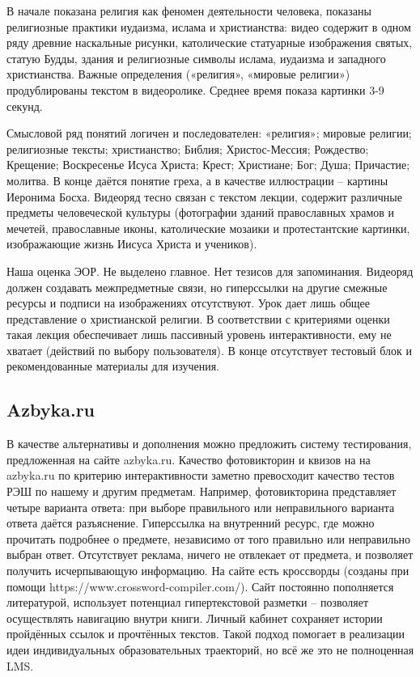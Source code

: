 В начале показана религия как феномен деятельности человека, показаны религиозные практики иудаизма, ислама и христианства: видео содержит в одном ряду древние наскальные рисунки, католические статуарные изображения святых, статую Будды, здания и религиозные символы ислама, иудаизма и западного христианства. Важные определения («религия», «мировые религии») продублированы текстом в видеоролике. Среднее время показа картинки 3-9 секунд.

Смысловой ряд понятий логичен и последователен: «религия»; мировые религии; религиозные тексты; христианство; Библия; Христос-Мессия; Рождество; Крещение; Воскресенье Исуса Христа; Крест; Христиане; Бог; Душа; Причастие; молитва. В конце даётся понятие греха, а в качестве иллюстрации – картины Иеронима Босха. Видеоряд тесно связан с текстом лекции, содержит различные предметы человеческой культуры (фотографии зданий православных храмов и мечетей, православные иконы, католические мозаики и протестантские картинки, изображающие жизнь Иисуса Христа и учеников).

Наша оценка ЭОР. Не выделено главное. Нет тезисов для запоминания. Видеоряд должен создавать межпредметные связи, но гиперссылки на другие смежные ресурсы и подписи на изображениях отсутствуют. Урок дает лишь общее представление о христианской религии. В соответствии с критериями оценки такая лекция обеспечивает лишь пассивный уровень интерактивности, ему не хватает (действий по выбору пользователя). В конце отсутствует тестовый блок и рекомендованные материалы для изучения.

\subsection{Azbyka.ru}
В качестве альтернативы и дополнения можно предложить систему тестирования, предложенная на сайте azbyka.ru. Качество фотовикторин и квизов на на azbyka.ru по критерию интерактивности заметно превосходит качество тестов РЭШ по нашему и другим предметам. Например, фотовикторина представляет четыре варианта ответа: при выборе правильного или неправильного варианта ответа даётся разъяснение. Гиперссылка на внутренний ресурс, где можно прочитать подробнее о предмете, независимо от того правильно или неправильно выбран ответ. Отсутствует реклама, ничего не отвлекает от предмета, и позволяет получить исчерпывающую информацию. На сайте есть кроссворды (созданы при помощи https://www.crossword-compiler.com/). Сайт постоянно пополняется литературой, использует потенциал гипертекстовой разметки – позволяет осуществлять навигацию внутри книги. Личный кабинет сохраняет истории пройдённых ссылок и прочтённых текстов. Такой подход помогает в реализации идеи индивидуальных образовательных траекторий, но всё же это не полноценная LMS.

